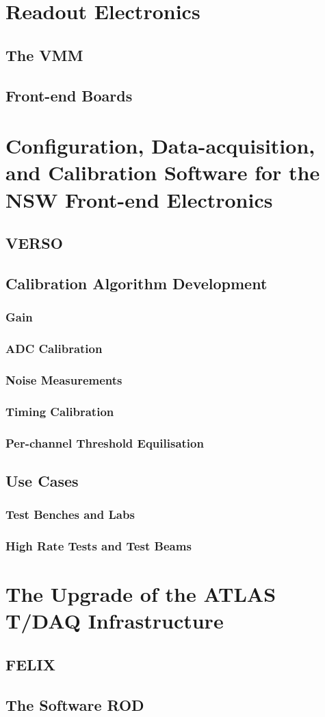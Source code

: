 \section{Readout Electronics}
\subsection{The VMM}
\subsection{Front-end Boards}

\section{Configuration, Data-acquisition, and Calibration Software for the NSW Front-end Electronics}
\subsection{VERSO}
\subsection{Calibration Algorithm Development}
\subsubsection{Gain}
\subsubsection{ADC Calibration}
\subsubsection{Noise Measurements}
\subsubsection{Timing Calibration}
\subsubsection{Per-channel Threshold Equilisation}
\subsection{Use Cases}
\subsubsection{Test Benches and Labs}
\subsubsection{High Rate Tests and Test Beams}

\section{The Upgrade of the ATLAS T/DAQ Infrastructure}
\subsection{FELIX}
\subsection{The Software ROD}
